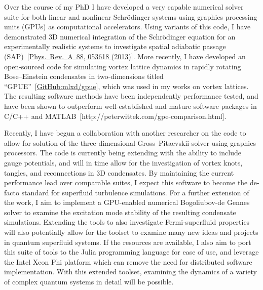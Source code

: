 \documentclass[12pt,a4paper,unicode]{moderncv}
\begin{document}
{    Over the course of my PhD I have developed a very capable numerical solver suite for both linear and nonlinear Schr\"odinger systems using graphics processing units (GPUs) as computational accelerators. Using variants of this code, I have demonstrated 3D numerical integration of the Schr\"odinger equation for an experimentally realistic systems to investigate spatial adiabatic passage (SAP)~[\href{http://journals.aps.org/pra/abstract/10.1103/PhysRevA.88.053618}{Phys.~Rev.~A~88, 053618 (2013)}]. More recently, I have developed an open-sourced code for simulating vortex lattice dynamics in rapidly rotating Bose--Einstein condensates in two-dimensions titled ``GPUE''~[\href{https://github.com/mlxd/gpue}{GitHub:mlxd/gpue}], which was used in my works on vortex lattices. The resulting software methods have been independently performance tested, and have been shown to outperform well-established and mature software packages in C/C++ and \textsc{MATLAB}~[http://peterwittek.com/gpe-comparison.html].

    Recently, I have begun a collaboration with another researcher on the code to allow for solution of the three-dimensional Gross--Pitaevskii solver using graphics processors. The code is currently being extending with the ability to include gauge potentials, and will in time allow for the investigation of vortex knots, tangles, and reconnections in 3D condensates. By maintaining the current performance lead over comparable suites, I expect this software to become the de-facto standard for superfluid turbulence simulations. For a further extension of the work, I aim to implement a GPU-enabled numerical Bogoliubov-de Gennes solver to examine the excitation mode stability of the resulting condensate simulations. Extending the tools to also investigate Fermi-superfluid properties will also potentially allow for the toolset to examine many new ideas and projects in quantum superfluid systems. If the resources are available, I also aim to port this suite of tools to the Julia programming language for ease of use, and leverage the Intel Xeon Phi platform which can remove the need for distributed software implementation.
    With this extended toolset, examining the dynamics of a variety of complex quantum systems in detail will be possible.

}
\end{document}
